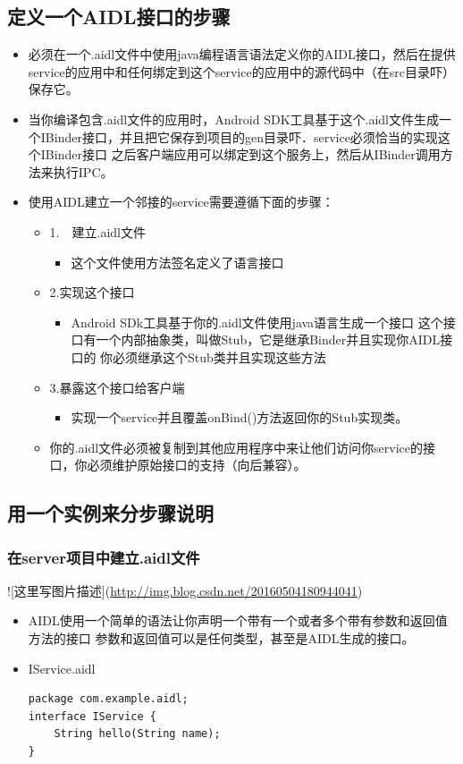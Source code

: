 \documentclass[9pt, b5paper]{article}
\begin{document}
\subsection{定义一个AIDL接口的步骤}
\label{sec-17-3}
\begin{itemize}
\item 必须在一个.aidl文件中使用java编程语言语法定义你的AIDL接口，然后在提供service的应用中和任何绑定到这个service的应用中的源代码中（在src目录吓）保存它。
\item 当你编译包含.aidl文件的应用时，Android SDK工具基于这个.aidl文件生成一个IBinder接口，并且把它保存到项目的gen目录吓．service必须恰当的实现这个IBinder接口 之后客户端应用可以绑定到这个服务上，然后从IBinder调用方法来执行IPC。
\item 使用AIDL建立一个邻接的service需要遵循下面的步骤：
\begin{itemize}
\item 1.　建立.aidl文件　
\begin{itemize}
\item 这个文件使用方法签名定义了语言接口　
\end{itemize}
\item 2.实现这个接口　
\begin{itemize}
\item Android SDk工具基于你的.aidl文件使用java语言生成一个接口 这个接口有一个内部抽象类，叫做Stub，它是继承Binder并且实现你AIDL接口的 你必须继承这个Stub类并且实现这些方法
\end{itemize}
\item 3.暴露这个接口给客户端　
\begin{itemize}
\item 实现一个service并且覆盖onBind()方法返回你的Stub实现类。
\end{itemize}
\item 你的.aidl文件必须被复制到其他应用程序中来让他们访问你service的接口，你必须维护原始接口的支持（向后兼容）。
\end{itemize}
\end{itemize}
\subsection{用一个实例来分步骤说明}
\label{sec-17-4}
\subsubsection{在server项目中建立.aidl文件　}
\label{sec-17-4-1}
![这里写图片描述](\url{http://img.blog.csdn.net/20160504180944041})
\begin{itemize}
\item AIDL使用一个简单的语法让你声明一个带有一个或者多个带有参数和返回值方法的接口 参数和返回值可以是任何类型，甚至是AIDL生成的接口。
\item IService.aidl
\begin{verbatim}
package com.example.aidl;
interface IService {
    String hello(String name); 
}
\end{verbatim}
\end{itemize}
\end{document}
